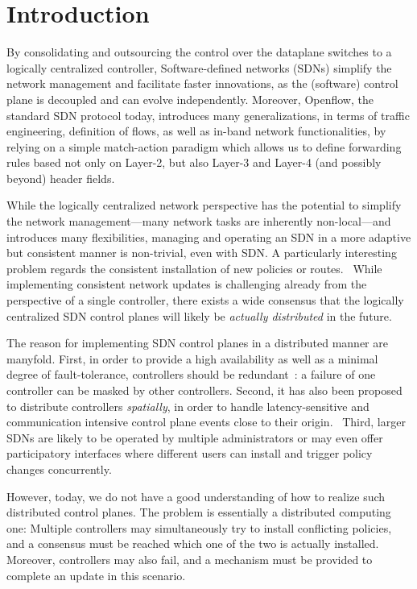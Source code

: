 \documentclass[conference]{sigcomm-alternate}
\begin{document}
\section{Introduction}\label{sec:intro}

By consolidating and outsourcing the control over the dataplane switches to a logically
centralized controller,
Software-defined networks (SDNs) simplify the network management and facilitate faster
innovations, as the (software) control plane is decoupled and can evolve independently.
Moreover, Openflow, the standard SDN protocol today, introduces many generalizations,
in terms of traffic engineering, definition of flows, as well as in-band network functionalities,
by relying on a simple match-action paradigm which allows us to define
forwarding rules based not only on Layer-2, but also Layer-3 and Layer-4 (and possibly beyond)
header fields.
 
While the logically centralized network perspective has the potential to simplify
the network management---many network tasks are inherently non-local---and introduces
many flexibilities,
managing and operating an SDN in a more adaptive but consistent manner is non-trivial, even with SDN.
A particularly interesting problem regards the consistent installation of new policies
or routes.~\cite{todo,todo,todo} While implementing consistent network updates 
is challenging already from the perspective of a single controller, there exists a wide consensus
that the logically centralized SDN control planes will likely be \emph{actually distributed} in the future.

The reason for implementing SDN control planes in a distributed manner are manyfold.
First, in order to provide a high availability as well as a minimal degree of
fault-tolerance, controllers should be redundant~\cite{onix,stn,todo}: a failure
of one controller can be masked by other controllers. Second, it has also been proposed
to distribute controllers \emph{spatially}, in order to handle latency-sensitive and
communication intensive control plane events close to their origin.~\cite{devoflow,kandoo,jukka,disco}
Third, larger SDNs are likely to be operated by multiple administrators or may even offer
participatory interfaces where different users can install and trigger policy changes
concurrently.~\cite{participatory,stn}

However, today, we do not have a good understanding of how to realize
such distributed control planes. The problem is essentially a distributed
computing one: Multiple controllers may simultaneously try to
install conflicting policies, and a consensus must be reached which one of
the two is actually installed. Moreover, controllers may also fail,
and a mechanism must be provided to complete an update in this scenario.
\end{document}

